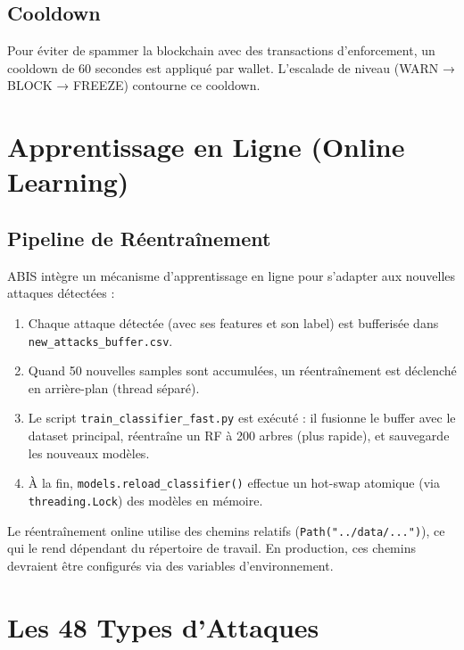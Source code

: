 \documentclass[12pt,a4paper]{report}
\newcommand{\code}[1]{\texttt{#1}}
\begin{document}
\subsection{Cooldown}

Pour éviter de spammer la blockchain avec des transactions d'enforcement, un cooldown de 60 secondes est appliqué par wallet. L'escalade de niveau (WARN → BLOCK → FREEZE) contourne ce cooldown.

\section{Apprentissage en Ligne (Online Learning)}

\subsection{Pipeline de Réentraînement}

ABIS intègre un mécanisme d'apprentissage en ligne pour s'adapter aux nouvelles attaques détectées :

\begin{enumerate}
  \item Chaque attaque détectée (avec ses features et son label) est bufferisée dans \code{new\_attacks\_buffer.csv}.
  \item Quand 50 nouvelles samples sont accumulées, un réentraînement est déclenché en arrière-plan (thread séparé).
  \item Le script \code{train\_classifier\_fast.py} est exécuté : il fusionne le buffer avec le dataset principal, réentraîne un RF à 200 arbres (plus rapide), et sauvegarde les nouveaux modèles.
  \item À la fin, \code{models.reload\_classifier()} effectue un hot-swap atomique (via \code{threading.Lock}) des modèles en mémoire.
\end{enumerate}

\begin{warningbox}
Le réentraînement online utilise des chemins relatifs (\code{Path("../data/...")}), ce qui le rend dépendant du répertoire de travail. En production, ces chemins devraient être configurés via des variables d'environnement.
\end{warningbox}

\section{Les 48 Types d'Attaques}
\end{document}

